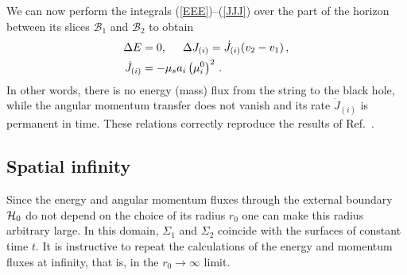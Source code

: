\documentclass[superscriptaddress,twocolumn,showpacs,
preprintnumbers,amsmath,amssymb,nofootinbib,
longbibliography,aps,prd,10pt]{revtex4-1}
\newcommand{\hh}{,\hspace{0.5cm}}
\newcommand{\n}[1]{\label{#1}}
\begin{document}
We can now perform the integrals (\ref{EEE})--(\ref{JJJ}) over the part of the horizon between its slices $\mathcal{B}_1$ and $\mathcal{B}_2$ to obtain
\begin{align}
\Delta E &= 0\hh
\Delta J_{(i)} =\dot{J}_{(i)}(v_2 - v_1)\, ,\n{EEJJ}\\
\dot{J}_{(i)}&= -\mu_s a_i \left( \mu_i^0 \right)^2 \, .\n{dJJ}
\end{align}
In other words, there is no energy (mass) flux from the string to the black hole, while the angular momentum transfer does not vanish and its rate $\dot{J}_{(i)}$ is permanent in time. These relations correctly reproduce the results of Ref.~\cite{Frolov:2004qw}.

\subsection{Spatial infinity}

Since the energy and angular momentum fluxes through the external boundary ${\cal H}_0$ do not depend on the choice of its radius $r_0$ one can make this radius arbitrary large.
In this domain, $\Sigma_1$ and $\Sigma_2$ coincide with the surfaces of constant time $t$. It is instructive to repeat the calculations of the energy and momentum fluxes at infinity, that is, in the $r_0\to\infty$ limit.
\end{document}
